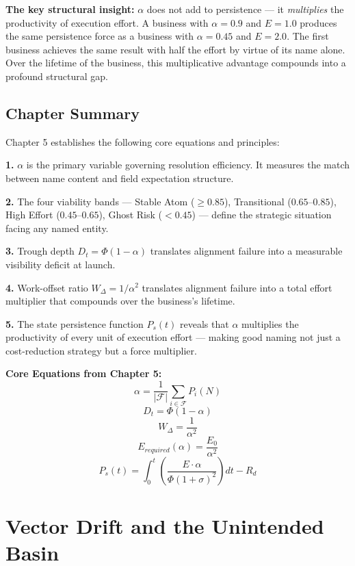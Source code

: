 \documentclass[12pt, openany]{book}
\theoremstyle{thmstyle}
\theoremstyle{defstyle}
\newcommand{\Wdelta}{W_{\Delta}}
\begin{document}
\textbf{The key structural insight:} $\alpha$ does not add to persistence --- it \textit{multiplies} the productivity of execution effort. A business with $\alpha = 0.9$ and $E = 1.0$ produces the same persistence force as a business with $\alpha = 0.45$ and $E = 2.0$. The first business achieves the same result with half the effort by virtue of its name alone. Over the lifetime of the business, this multiplicative advantage compounds into a profound structural gap.

\section{Chapter Summary}

Chapter 5 establishes the following core equations and principles:

\textbf{1.} $\alpha$ is the primary variable governing resolution efficiency. It measures the match between name content and field expectation structure.

\textbf{2.} The four viability bands --- Stable Atom ($\geq 0.85$), Transitional ($0.65$--$0.85$), High Effort ($0.45$--$0.65$), Ghost Risk ($< 0.45$) --- define the strategic situation facing any named entity.

\textbf{3.} Trough depth $D_t = \Phi(1-\alpha)$ translates alignment failure into a measurable visibility deficit at launch.

\textbf{4.} Work-offset ratio $\Wdelta = 1/\alpha^2$ translates alignment failure into a total effort multiplier that compounds over the business's lifetime.

\textbf{5.} The state persistence function $P_s(t)$ reveals that $\alpha$ multiplies the productivity of every unit of execution effort --- making good naming not just a cost-reduction strategy but a force multiplier.

\begin{equationbox}
\textbf{Core Equations from Chapter 5:}
\[
\alpha = \frac{1}{|\mathcal{F}|} \sum_{i \in \mathcal{F}} P_i(N)
\]
\[
D_t = \Phi(1 - \alpha)
\]
\[
W_{\Delta} = \frac{1}{\alpha^2}
\]
\[
E_{required}(\alpha) = \frac{E_0}{\alpha^2}
\]
\[
P_s(t) = \int_0^t \left(\frac{E \cdot \alpha}{\Phi(1+\sigma)^2}\right) dt - R_d
\]
\end{equationbox}

\chapter{Vector Drift and the Unintended Basin}
\end{document}
